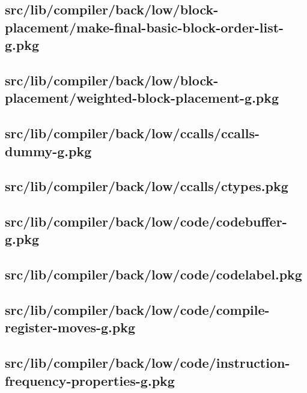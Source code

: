 \subsection{src/lib/compiler/back/low/block-placement/make-final-basic-block-order-list-g.pkg}


\subsection{src/lib/compiler/back/low/block-placement/weighted-block-placement-g.pkg}


\subsection{src/lib/compiler/back/low/ccalls/ccalls-dummy-g.pkg}


\subsection{src/lib/compiler/back/low/ccalls/ctypes.pkg}


\subsection{src/lib/compiler/back/low/code/codebuffer-g.pkg}


\subsection{src/lib/compiler/back/low/code/codelabel.pkg}


\subsection{src/lib/compiler/back/low/code/compile-register-moves-g.pkg}


\subsection{src/lib/compiler/back/low/code/instruction-frequency-properties-g.pkg}


